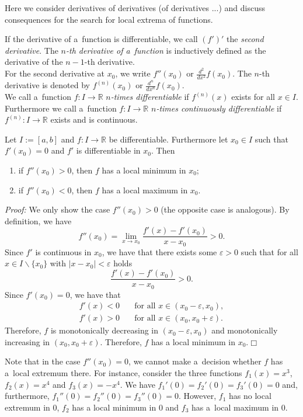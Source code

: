 

Here we consider derivatives of derivatives (of derivatives ...) and discuss consequences for the search for local extrema of functions.

\begin{Definition}{}
If the derivative of a~function is differentiable, we call $(f')'$ the \emph{second derivative}. The \emph{$n$-th derivative of a~function} is inductively defined as the derivative of the $n-1$-th derivative.\\
For the second derivative at $x_0$, we write
$f''(x_0)$ or $\frac{d^2}{dx^2}f(x_0)$. The $n$-th derivative is denoted by
$f^{(n)}(x_0)$ or $\frac{d^n}{dx^n}f(x_0)$.\\
    We call a~function $f:I\to\mathbb{R}$ \emph{$n$-times differentiable} if $f^{(n)}(x)$ exists for all $x\in I$.\\
    Furthermore we call a~function $f:I\to\mathbb{R}$ \emph{$n$-times continuously differentiable} if $f^{(n)}:I\to\mathbb{R}$ exists and is continuous.\\
\end{Definition}

\begin{Theorem}{}\label{th:localextr}
    Let $I:=[a,b]$ and $f:I\to\mathbb{R}$ be differentiable. Furthermore let $x_0\in I$ such that $f'(x_0)=0$ and $f'$ is differentiable in $x_0$. Then
\begin{enumerate}
 \item if $f''(x_0)>0$, then $f$ has a local minimum in $x_0$;
 \item if $f''(x_0)<0$, then $f$ has a local maximum in $x_0$.
\end{enumerate}
\end{Theorem}
{\em Proof:} We only show the case $f''(x_0)>0$ (the opposite case is analogous). By definition, we have
\[f''(x_0)=\lim_{x\to x_0}\frac{f'(x)-f'(x_0)}{x-x_0}>0.\]
Since $f'$ is continuous in $x_0$, we have that there exists some $\varepsilon>0$ such that for all $x\in I\backslash\{x_0\}$ 
with $|x-x_0|<\varepsilon$ holds
\[\frac{f'(x)-f'(x_0)}{x-x_0}>0.\]
Since $f'(x_0)=0$, we have that
\[
\begin{aligned}
 f'(x)<0&\quad\text{for all }x\in(x_0-\varepsilon,x_0),\\
 f'(x)>0&\quad\text{for all }x\in(x_0,x_0+\varepsilon).
\end{aligned}
\]
Therefore, $f$ is monotonically decreasing in $(x_0-\varepsilon,x_0)$ and monotonically increasing in 
$(x_0,x_0+\varepsilon)$. 
Therefore, $f$ has a local minimum in $x_0$.\hfill$\Box$
\begin{Remark}{}
 Note that in the case $f''(x_0)=0$, we cannot make a~decision whether $f$ has a~local extremum there. 
 For instance, consider the three functions $f_1(x)=x^3$, $f_2(x)=x^4$ and $f_3(x)=-x^4$. We have $f_1'(0)=f_2'(0)=f_3'(0)=0$ and, 
 furthermore, $f_1''(0)=f_2''(0)=f_3''(0)=0$. However, $f_1$ has no local extremum in $0$, $f_2$ has a local minimum in $0$ and $f_3$ 
 has a~local maximum in $0$.
\end{Remark}

